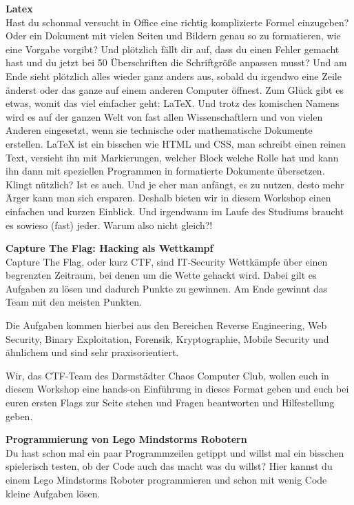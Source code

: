 {\textbf{Latex}\\
Hast du schonmal versucht in Office eine richtig komplizierte Formel einzugeben?
Oder ein Dokument mit vielen Seiten und Bildern genau so zu formatieren, wie eine
Vorgabe vorgibt? Und plötzlich fällt dir auf, dass du einen Fehler gemacht hast
und du jetzt bei 50 Überschriften die Schriftgröße anpassen musst? Und am Ende sieht
plötzlich alles wieder ganz anders aus, sobald du irgendwo eine Zeile änderst oder
das ganze auf einem anderen Computer öffnest. Zum Glück gibt es etwas, womit das
viel einfacher geht: LaTeX. Und trotz des komischen Namens wird es auf der ganzen
Welt von fast allen Wissenschaftlern und von vielen Anderen eingesetzt, wenn sie
technische oder mathematische Dokumente erstellen. LaTeX ist ein bisschen wie HTML
und CSS, man schreibt einen reinen Text, versieht ihn mit Markierungen, welcher
Block welche Rolle hat und kann ihn dann mit speziellen Programmen in formatierte
Dokumente übersetzen. Klingt nützlich? Ist es auch. Und je eher man anfängt, es zu
nutzen, desto mehr Ärger kann man sich ersparen. Deshalb bieten wir in diesem Workshop
einen einfachen und kurzen Einblick. Und irgendwann im Laufe des Studiums braucht
es sowieso (fast) jeder. Warum also nicht gleich?!


\textbf{Capture The Flag: Hacking als Wettkampf}\\
Capture The Flag, oder kurz CTF, sind IT-Security Wettkämpfe über einen begrenzten Zeitraum, bei denen um die Wette gehackt wird. 
Dabei gilt es Aufgaben zu lösen und dadurch Punkte zu gewinnen. Am Ende gewinnt das Team mit den meisten Punkten.

Die Aufgaben kommen hierbei aus den Bereichen Reverse Engineering, Web Security, Binary Exploitation, Forensik, Kryptographie, Mobile Security und ähnlichem und sind sehr praxisorientiert.

Wir, das CTF-Team des Darmstädter Chaos Computer Club, wollen euch in diesem Workshop eine hands-on Einführung in dieses Format geben und euch bei euren ersten Flags zur Seite stehen und Fragen beantworten und Hilfestellung geben.

\textbf{Programmierung von Lego Mindstorms Robotern}\\
Du hast schon mal ein paar Programmzeilen getippt und willst mal ein bisschen spielerisch testen, ob der Code auch das macht was du willst?
Hier kannst du einem Lego Mindstorms Roboter programmieren und schon mit wenig Code kleine Aufgaben lösen.

}
